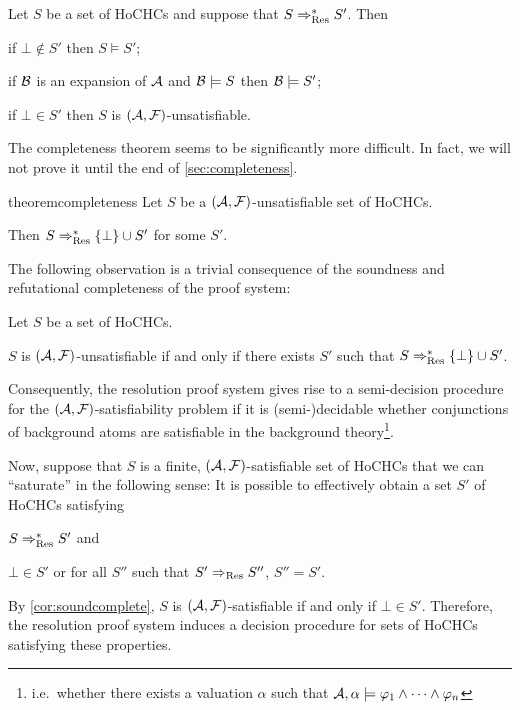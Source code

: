 \documentclass[a4paper,twoside,notitlepage,openright,11pt]{report}
\begin{document}
\begin{corollary}[Soundness]
  \label{prop:soundness}
  Let $S$ be a set of HoCHCs and suppose that $S\Rightarrow_{\operatorname{Res}}^* S'$. Then
  \begin{thmlist}
  \item if $\bot\nin S'$ then $S\models S'$;
  \item if $\mathcal B$ is an expansion of $\mathcal A$ and $\mathcal B\models S$ then $\mathcal B\models S'$;
  \item if $\bot\in S'$ then $S$ is $(\mathcal A,\mathcal F)$-unsatisfiable.
  \end{thmlist}
\end{corollary}
The completeness theorem seems to be significantly more difficult. In fact, we will not prove it until the end of \cref{sec:completeness}.
\begin{restatable}[Completeness]{theorem}{completeness}
  \label{thm:completeness}
  Let $S$ be a $(\mathcal A,\mathcal F)$-unsatisfiable set of HoCHCs.

  Then $S\Rightarrow_{\operatorname{Res}}^*\{\bot\}\cup S'$ for some $S'$.
\end{restatable}
The following observation is a trivial consequence of the soundness and refutational completeness of the proof system:
\begin{corollary}
  \label{cor:soundcomplete}
  Let $S$ be a set of HoCHCs. 

  $S$ is $(\mathcal A,\mathcal F)$-unsatisfiable if and only if there exists $S'$ such that $S\Rightarrow_{\operatorname{Res}}^*\{\bot\}\cup S'$.
\end{corollary}

Consequently, the resolution proof system gives rise to a semi-decision procedure for the $(\mathcal A,\mathcal F)$-satisfiability problem if it is (semi-)decidable whether conjunctions of background atoms are satisfiable in the background theory\footnote{i.e.\ whether there exists a valuation $\alpha$ such that $\mathcal A,\alpha\models\varphi_1\land\cdots\land\varphi_n$}.

Now, suppose that $S$ is a finite, $(\mathcal A,\mathcal F)$-satisfiable set of HoCHCs that we can ``saturate'' in the following sense: It is possible to effectively obtain a set $S'$ of HoCHCs satisfying
\begin{enumerate*}
\item $S\Rightarrow_{\operatorname{Res}}^* S'$ and
\item $\bot\in S'$ or for all $S''$ such that $S'\Rightarrow_{\operatorname{Res}} S''$, $S''=S'$.
\end{enumerate*}
By \cref{cor:soundcomplete}, $S$ is $(\mathcal A,\mathcal F)$-satisfiable if and only if $\bot\in S'$. Therefore, the resolution proof system induces a decision procedure for sets of HoCHCs satisfying these properties.
\end{document}
